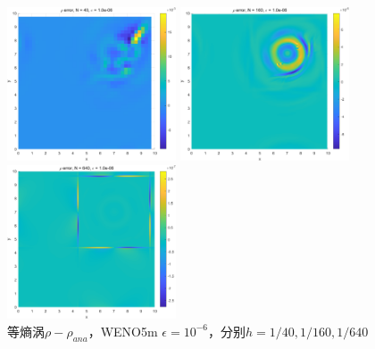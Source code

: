 \documentclass[UTF8,zihao=5]{ctexart} %
\begin{document}
\begin{figure}[H]
    \begin{minipage}[c]{0.32\linewidth}  %
        \centering
        \includegraphics[width=5cm]{Err_40_E6m.png}  %
    \end{minipage}
    \hfill %
    \begin{minipage}[c]{0.32\linewidth}  %
        \centering
        \includegraphics[width=5cm]{Err_160_E6m.png}  %
    \end{minipage}
    \hfill %
    \begin{minipage}[c]{0.32\linewidth}  %
        \centering
        \includegraphics[width=5cm]{Err_640_E6m.png}  %
    \end{minipage}
    \caption{等熵涡$\rho-\rho_{ana}$，WENO5m $\epsilon=10^{-6}$，分别$h=1/40,1/160,1/640$}
\end{figure}
\end{document}
